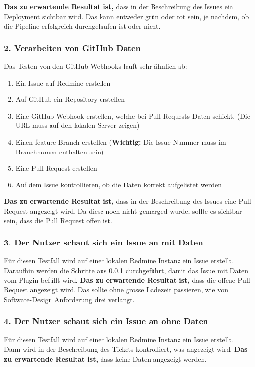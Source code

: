\textbf{Das zu erwartende Resultat ist,} dass in der Beschreibung des Issues ein Deployment sichtbar wird. Das kann entweder grün oder rot
sein, je nachdem, ob die Pipeline erfolgreich durchgelaufen ist oder nicht.

\subsubsection{2. Verarbeiten von GitHub Daten}
\label{sec:github-testing}
Das Testen von den GitHub Webhooks lauft sehr ähnlich ab:
\begin{enumerate}
  \item Ein Issue auf Redmine erstellen
  \item Auf GitHub ein Repository erstellen
  \item Eine GitHub Webhook erstellen, welche bei Pull Requests Daten schickt. (Die URL muss auf den lokalen Server zeigen)
  \item Einen feature Branch erstellen (\textbf{Wichtig:} Die Issue-Nummer muss im Branchnamen enthalten sein)
  \item Eine Pull Request erstellen
  \item Auf dem Issue kontrollieren, ob die Daten korrekt aufgelistet werden
\end{enumerate}

\textbf{Das zu erwartende Resultat ist,} dass in der Beschreibung des Issues eine Pull Request angezeigt wird. Da diese noch nicht gemerged
wurde, sollte es sichtbar sein, dass die Pull Request offen ist.

\subsubsection{3. Der Nutzer schaut sich ein Issue an mit Daten}
Für diesen Testfall wird auf einer lokalen Redmine Instanz ein Issue erstellt. Daraufhin werden die Schritte aus
\ref{sec:github-testing} durchgeführt, damit das Issue mit Daten vom Plugin befüllt wird. \newline
\textbf{Das zu erwartende Resultat ist,} dass die offene Pull Request angezeigt wird. Das sollte ohne grosse Ladezeit passieren, wie von 
Software-Design Anforderung drei verlangt.

\subsubsection{4. Der Nutzer schaut sich ein Issue an ohne Daten}
Für diesen Testfall wird auf einer lokalen Redmine Instanz ein Issue erstellt. Dann wird in der Beschreibung des Tickets
kontrolliert, was angezeigt wird. \newline
\textbf{Das zu erwartende Resultat ist,} dass keine Daten angezeigt werden.

